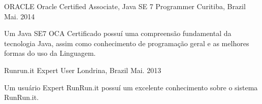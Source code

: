 

\begin{cventries}

  \cventry
    {ORACLE} %
    {Oracle Certified Associate, Java SE 7 Programmer} %
    {Curitiba, Brazil} %
    {Mai. 2014} %
    {
      \begin{cvitems} %
        \item {Um Java SE7 OCA Certificado possuí uma compreensão fundamental da tecnologia Java, assim como conhecimento de programação geral e as melhores formas do uso da Linguagem.}
      \end{cvitems}
    }

  \cventry
    {Runrun.it} %
    {Expert User} %
    {Londrina, Brazil} %
    {Mai. 2013} %
    {
      \begin{cvitems} %
        \item {Um usuário Expert RunRun.it possuí um excelente conhecimento sobre o sistema RunRun.it.}
      \end{cvitems}
    }

\end{cventries}
